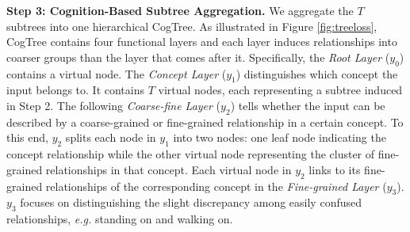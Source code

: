 \documentclass{article}
\begin{document}
\textbf{Step 3: Cognition-Based Subtree Aggregation.} We aggregate the $T$ subtrees into one hierarchical CogTree. As illustrated in Figure \ref{fig:treeloss}, CogTree contains four functional layers and each layer induces relationships into coarser groups than the layer that comes after it. Specifically, the \textit{Root Layer} ($y_0$) contains a virtual node. The  \textit{Concept Layer} ($y_1$) distinguishes which concept the input belongs to. It contains $T$ virtual nodes, each representing a subtree induced in Step 2. The following \textit{Coarse-fine Layer} ($y_2$) tells whether the input can be described by a coarse-grained or fine-grained relationship in a certain concept.  To this end, $y_2$ splits each node in $y_1$ into two nodes: one leaf node indicating the concept relationship while the other virtual node representing the cluster of fine-grained relationships in that concept. Each virtual node in $y_2$ links to its fine-grained relationships of the corresponding concept in the \textit{Fine-grained Layer} ($y_3$). $y_3$ focuses on distinguishing the slight discrepancy among easily confused relationships, \textit{e.g.} {\ttfamily standing on} and {\ttfamily walking on}.
\end{document}
